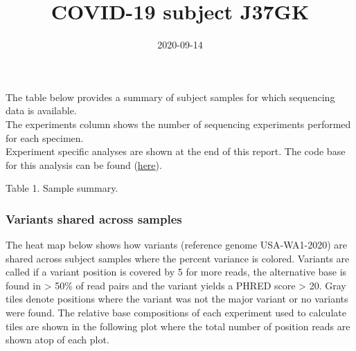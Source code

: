\documentclass[12pt,]{article}
\title{COVID-19 subject J37GK}
\author{}
\date{2020-09-14}
\begin{document}
\maketitle

The table below provides a summary of subject samples for which
sequencing data is available.\\
The experiments column shows the number of sequencing experiments
performed for each specimen.\\
Experiment specific analyses are shown at the end of this report. The
code base for this analysis can be found
(\href{https://github.com/everettJK/SARS-CoV-2-Philadelphia}{here}).

\vspace{0.5cm}

\small
Table 1. Sample summary. \normalsize

\begin{table}[H]
\centering
{}
\end{table}

\newpage

\subsubsection{Variants shared across
samples}\label{variants-shared-across-samples}

The heat map below shows how variants (reference genome USA-WA1-2020)
are shared across subject samples where the percent variance is colored.
Variants are called if a variant position is covered by 5 for more
reads, the alternative base is found in \textgreater{} 50\% of read
pairs and the variant yields a PHRED score \textgreater{} 20. Gray tiles
denote positions where the variant was not the major variant or no
variants were found. The relative base compositions of each experiment
used to calculate tiles are shown in the following plot where the total
number of position reads are shown atop of each plot.
\end{document}
